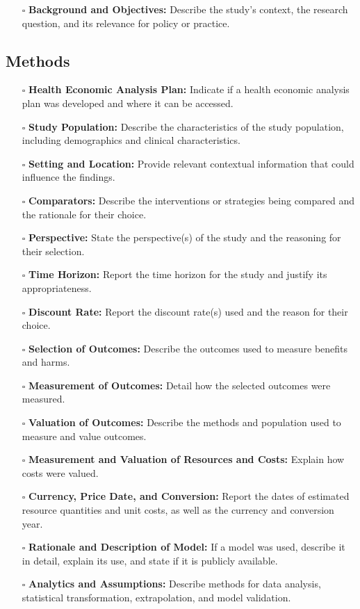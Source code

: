 \documentclass[11pt]{article}
\def\tightlist{}
\begin{document}
\begin{Form}
\begin{itemize}
\tightlist
\item[$\square$]
  \textbf{Background and Objectives:} Describe the study's context, the
  research question, and its relevance for policy or practice.
\end{itemize}

\subsection{Methods}\label{methods}

\begin{itemize}
\tightlist
\item[$\square$]
  \textbf{Health Economic Analysis Plan:} Indicate if a health economic
  analysis plan was developed and where it can be accessed.
\item[$\square$]
  \textbf{Study Population:} Describe the characteristics of the study
  population, including demographics and clinical characteristics.
\item[$\square$]
  \textbf{Setting and Location:} Provide relevant contextual information
  that could influence the findings.
\item[$\square$]
  \textbf{Comparators:} Describe the interventions or strategies being
  compared and the rationale for their choice.
\item[$\square$]
  \textbf{Perspective:} State the perspective(s) of the study and the
  reasoning for their selection.
\item[$\square$]
  \textbf{Time Horizon:} Report the time horizon for the study and
  justify its appropriateness.
\item[$\square$]
  \textbf{Discount Rate:} Report the discount rate(s) used and the
  reason for their choice.
\item[$\square$]
  \textbf{Selection of Outcomes:} Describe the outcomes used to measure
  benefits and harms.
\item[$\square$]
  \textbf{Measurement of Outcomes:} Detail how the selected outcomes
  were measured.
\item[$\square$]
  \textbf{Valuation of Outcomes:} Describe the methods and population
  used to measure and value outcomes.
\item[$\square$]
  \textbf{Measurement and Valuation of Resources and Costs:} Explain how
  costs were valued.
\item[$\square$]
  \textbf{Currency, Price Date, and Conversion:} Report the dates of
  estimated resource quantities and unit costs, as well as the currency
  and conversion year.
\item[$\square$]
  \textbf{Rationale and Description of Model:} If a model was used,
  describe it in detail, explain its use, and state if it is publicly
  available.
\item[$\square$]
  \textbf{Analytics and Assumptions:} Describe methods for data
  analysis, statistical transformation, extrapolation, and model
  validation.
\end{itemize}


\end{Form}
\end{document}

